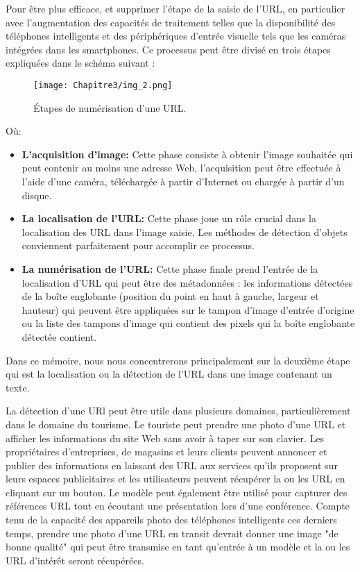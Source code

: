 Pour être plus efficace, et supprimer l'étape de la saisie de l'URL, en particulier avec l'augmentation des capacités de traitement telles que la disponibilité des téléphones intelligents et des périphériques d'entrée visuelle tels que les caméras intégrées dans les smartphones. Ce processus peut être divisé en trois étapes expliquées dans le schéma suivant :
     \begin{figure}[H]
          \centering
          \texttt{[image: Chapitre3/img\_2.png]}
          \caption{Étapes de numérisation d'une URL.}
          \label{img2}
          \end{figure}

Où: 
\begin{itemize}
\item \textbf{L'acquisition d'image:} Cette phase consiste à obtenir l'image souhaitée qui peut contenir au moins une adresse Web, l'acquisition peut être effectuée à l'aide d'une caméra, téléchargée à partir d'Internet ou chargée à partir d'un disque.
\item \textbf{La localisation de l'URL:} Cette phase joue un rôle crucial dans la localisation des URL dans l'image saisie. Les méthodes de détection d'objets conviennent parfaitement pour accomplir ce processus.
\item \textbf{La numérisation de l'URL:} Cette phase finale prend l'entrée de la localisation d'URL qui peut être des métadonnées : les informations détectées de la boîte englobante (position du point en haut à gauche, largeur et hauteur) qui peuvent être appliquées sur le tampon 	d'image d'entrée d'origine ou la liste des tampons d'image qui contient des pixels qui la boîte englobante détectée contient.
\end{itemize}
    
Dans ce mémoire, nous nous concentrerons principalement sur la deuxième étape qui est la localisation ou la détection de l'URL dans une image contenant un texte.

La détection d'une URl peut être utile dans plusieurs domaines, particulièrement dans le domaine du tourisme. Le touriste peut prendre une photo d'une URL et afficher les informations du site Web sans avoir à taper sur son clavier. Les propriétaires d'entreprises, de magasins et leurs clients peuvent annoncer et publier des informations en laissant des URL aux services qu'ils proposent sur leurs espaces publicitaires et les utilisateurs peuvent récupérer la ou les URL en cliquant sur un bouton. Le modèle peut également être utilisé pour capturer des références URL tout en écoutant une présentation lors d'une conférence.  Compte tenu de la capacité des appareils photo des téléphones intelligents ces derniers temps, prendre une photo d'une URL en transit devrait donner une image "de bonne qualité" qui peut être transmise en tant qu'entrée à un modèle et la ou les URL d'intérêt seront récupérées.

